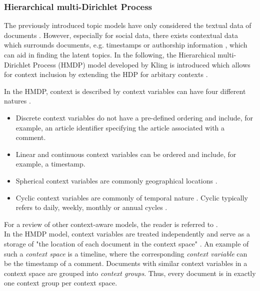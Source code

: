 \subsubsection{Hierarchical multi-Dirichlet Process}
The previously introduced topic models have only considered the textual data of documents \cite{DBLP:phd/dnb/Kling16}. However, especially for social data, there exists contextual data which surrounds documents, e.g. timestamps or authorship information \cite{DBLP:phd/dnb/Kling16}, which can aid in finding the latent topics. In the following, the Hierarchical multi-Dirichlet Process (HMDP) model developed by Kling \cite{DBLP:phd/dnb/Kling16} is introduced which allows for context inclusion by extending the HDP \cite{Teh04hierarchicaldirichlet} for arbitary contexts \cite{DBLP:phd/dnb/Kling16}. \par
In the HMDP, context is described by context variables can have four different natures \cite{DBLP:phd/dnb/Kling16}.
\begin{itemize}
\item Discrete context variables do not have a pre-defined ordering \cite{DBLP:phd/dnb/Kling16} and include, for example, an article identifier specifying the article associated with a comment.
\item Linear and continuous context variables can be ordered \cite{DBLP:phd/dnb/Kling16} and include, for example, a timestamp.
\item Spherical context variables are commonly geographical locations \cite{DBLP:phd/dnb/Kling16}.
\item Cyclic context variables are commonly of temporal nature \cite{DBLP:phd/dnb/Kling16}. Cyclic typically refers to daily, weekly, monthly or annual cycles \cite{DBLP:phd/dnb/Kling16}.
\end{itemize}
For a review of other context-aware models, the reader is referred to \cite{DBLP:phd/dnb/Kling16}. \\
In the HMDP model, context variables are treated independently and serve as a storage of "the location of each document in the context space" \cite{DBLP:phd/dnb/Kling16}. An example of such a \textit{context space} is a timeline, where the corresponding \textit{context variable} can be the timestamp of a comment. Documents with similar context variables in a context space are grouped into \textit{context groups}. Thus, every document is in exactly one context group per context space.  
